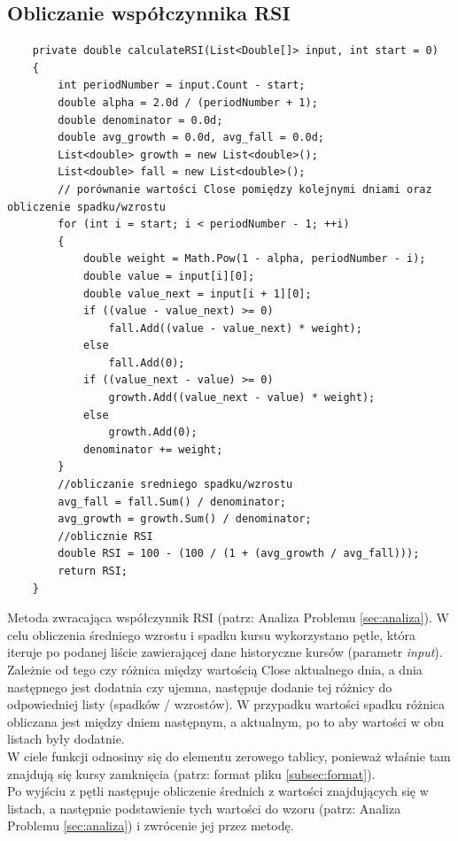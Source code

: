 \documentclass[a4paper]{article}
\begin{document}
	\subsection{Obliczanie współczynnika RSI}
	\begin{lstlisting}
	private double calculateRSI(List<Double[]> input, int start = 0)
	{
		int periodNumber = input.Count - start;
		double alpha = 2.0d / (periodNumber + 1);
		double denominator = 0.0d;
		double avg_growth = 0.0d, avg_fall = 0.0d;
		List<double> growth = new List<double>();
		List<double> fall = new List<double>();
		// porównanie wartości Close pomiędzy kolejnymi dniami oraz obliczenie spadku/wzrostu
		for (int i = start; i < periodNumber - 1; ++i)
		{
			double weight = Math.Pow(1 - alpha, periodNumber - i);
			double value = input[i][0];
			double value_next = input[i + 1][0];
			if ((value - value_next) >= 0)
				fall.Add((value - value_next) * weight);
			else
				fall.Add(0);
			if ((value_next - value) >= 0)
				growth.Add((value_next - value) * weight);
			else
				growth.Add(0);
			denominator += weight;
		}
		//obliczanie sredniego spadku/wzrostu
		avg_fall = fall.Sum() / denominator;
		avg_growth = growth.Sum() / denominator;
		//oblicznie RSI
		double RSI = 100 - (100 / (1 + (avg_growth / avg_fall)));
		return RSI;
	}
	\end{lstlisting}
	Metoda zwracająca współczynnik RSI (patrz: Analiza Problemu \ref{sec:analiza}). W celu obliczenia średniego wzrostu i spadku kursu wykorzystano pętle, która iteruje po podanej liście zawierającej dane historyczne kursów (parametr \emph{input}). Zależnie od tego czy różnica między wartością Close aktualnego dnia, a dnia następnego jest dodatnia czy ujemna, następuje dodanie tej różnicy do odpowiedniej listy (spadków / wzrostów). W przypadku wartości spadku różnica obliczana jest między dniem następnym, a aktualnym, po to aby wartości w obu listach były dodatnie.\\
	W ciele funkcji odnosimy się do elementu zerowego tablicy, ponieważ właśnie tam znajdują się kursy zamknięcia (patrz: format pliku \ref{subsec:format}).\\
	Po wyjściu z pętli następuje obliczenie średnich z wartości znajdujących się w listach, a następnie podstawienie tych wartości do wzoru (patrz: Analiza Problemu \ref{sec:analiza}) i zwrócenie jej przez metodę.
	\newpage
\end{document}
